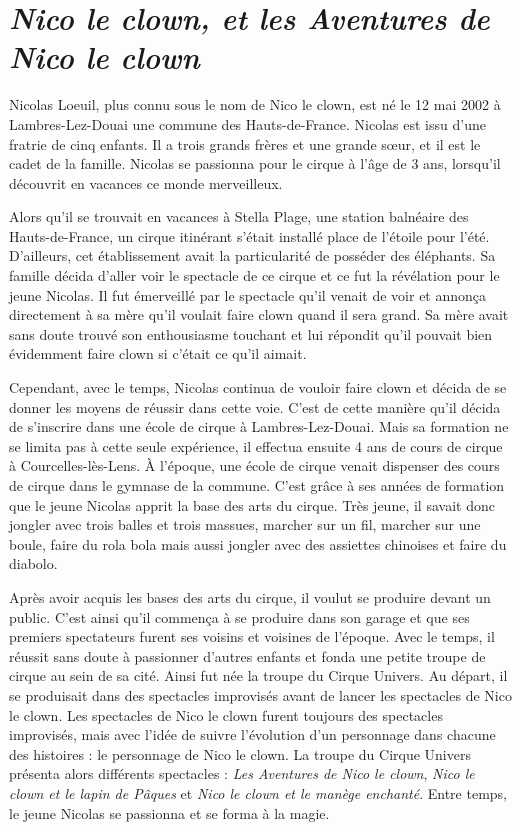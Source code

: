 \section*{\textit{Nico le clown, et les Aventures de Nico le clown}}
{}
\noindent
Nicolas Loeuil, plus connu sous le nom de Nico le clown, est né le 12 mai 2002 à Lambres-Lez-Douai une commune des Hauts-de-France. Nicolas est issu d’une fratrie de cinq enfants. Il a trois grands frères et une grande sœur, et il est le cadet de la famille. Nicolas se passionna pour le cirque à l’âge de 3 ans, lorsqu’il découvrit en vacances ce monde merveilleux.

Alors qu’il se trouvait en vacances à Stella Plage, une station balnéaire des Hauts-de-France, un cirque itinérant s’était installé place de l’étoile pour l’été. D'ailleurs, cet établissement avait la particularité de posséder des éléphants. Sa famille décida d'aller voir le spectacle de ce cirque et ce fut la révélation pour le jeune Nicolas. Il fut émerveillé par le spectacle qu’il venait de voir et annonça directement à sa mère qu’il voulait faire clown quand il sera grand. Sa mère avait sans doute trouvé son enthousiasme touchant et lui répondit qu’il pouvait bien évidemment faire clown si c’était ce qu’il aimait.  

Cependant, avec le temps, Nicolas continua de vouloir faire clown et décida de se donner les moyens de réussir dans cette voie. C’est de cette manière qu’il décida de s’inscrire dans une école de cirque à Lambres-Lez-Douai. Mais sa formation ne se limita pas à cette seule expérience, il effectua ensuite 4 ans de cours de cirque à Courcelles-lès-Lens. À l’époque, une école de cirque venait dispenser des cours de cirque dans le gymnase de la commune. C’est grâce à ses années de formation que le jeune Nicolas apprit la base des arts du cirque. Très jeune, il savait donc jongler avec trois balles et trois massues, marcher sur un fil, marcher sur une boule, faire du rola bola mais aussi jongler avec des assiettes chinoises et faire du diabolo.

Après avoir acquis les bases des arts du cirque, il voulut se produire devant un public. C’est ainsi qu’il commença à se produire dans son garage et que ses premiers spectateurs furent ses voisins et voisines de l’époque. Avec le temps, il réussit sans doute à passionner d’autres enfants et fonda une petite troupe de cirque au sein de sa cité. Ainsi fut née la troupe du Cirque Univers. Au départ, il se produisait dans des spectacles improvisés avant de lancer les spectacles de Nico le clown. Les spectacles de Nico le clown furent toujours des spectacles improvisés, mais avec l'idée de suivre l’évolution d’un personnage dans chacune des histoires : le personnage de Nico le clown. La troupe du Cirque Univers présenta alors différents spectacles : \textit{Les Aventures de Nico le clown}, \textit{Nico le clown et le lapin de Pâques} et \textit{Nico le clown et le manège enchanté}. Entre temps, le jeune Nicolas se passionna et se forma à la magie.

